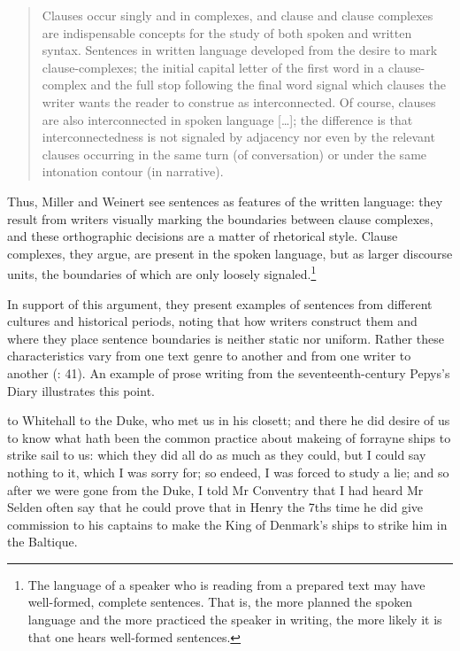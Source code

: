 \begin{quote}
Clauses occur singly and in complexes, and clause and clause complexes are indispensable concepts for the study of both spoken and written syntax. Sentences in written language developed from the desire to mark clause-complexes; the initial capital letter of the first word in a clause-complex and the full stop following the final word signal which clauses the writer wants the reader to construe as interconnected. Of course, clauses are also interconnected in spoken language […]; the difference is that interconnectedness is not signaled by adjacency nor even by the relevant clauses occurring in the same turn (of conversation) or under the same intonation contour (in narrative).
\end{quote}

\noindent Thus, Miller and Weinert see sentences as features of the written language: they result from writers visually marking the boundaries between clause complexes, and these orthographic decisions are a matter of rhetorical style. Clause complexes, they argue, are present in the spoken language, but as larger discourse units, the boundaries of which are only loosely signaled.\footnote{{The language of a speaker who is reading from a prepared text may have well-formed, complete sentences. That is, the more planned the spoken language and the more practiced the speaker in writing, the more likely it is that one hears well-formed sentences.}}

In support of this argument, they present examples of sentences from different cultures and historical periods, noting that how writers construct them and where they place sentence boundaries is neither static nor uniform. Rather these characteristics vary from one text genre to another and from one writer to another (\citealt{MillerWeinert1998}: 41). An example of prose writing from the seventeenth-century Pepys’s Diary  illustrates this point.

\ea%
    \label{ex:7:5}

          to Whitehall to the Duke, who met us in his closett; and there he did desire of us to know what hath been the common practice about makeing of forrayne ships to strike sail to us: which they did all do as much as they could, but I could say nothing to it, which I was sorry for; so endeed, I was forced to study a lie; and so after we were gone from the Duke, I told Mr Conventry that I had heard Mr Selden often say that he could prove that in Henry the 7ths time he did give commission to his captains to make the King of Denmark’s ships to strike him in the Baltique.
    \z


